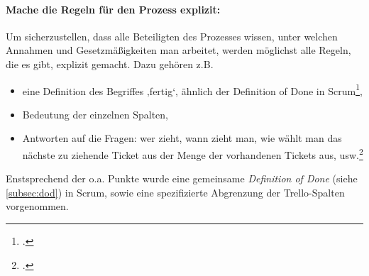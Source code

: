 \paragraph{Mache die Regeln für den Prozess explizit:}Um sicherzustellen, dass alle Beteiligten des Prozesses wissen, unter welchen Annahmen und Gesetzmäßigkeiten man arbeitet, werden möglichst alle Regeln, die es gibt, explizit gemacht. Dazu gehören z.B.
\begin{itemize}
\item eine Definition des Begriffes ‚fertig‘, ähnlich der Definition of Done in Scrum\footcite{wikiScrum},
\item Bedeutung der einzelnen Spalten,
\item Antworten auf die Fragen: wer zieht, wann zieht man, wie wählt man das nächste zu ziehende Ticket aus der Menge der vorhandenen Tickets aus, usw.\footcite{wikiKanban}
\end{itemize}

Enstsprechend der o.a. Punkte wurde eine gemeinsame \emph{Definition of Done} (siehe \ref{subsec:dod}) in Scrum, sowie eine spezifizierte Abgrenzung der Trello-Spalten vorgenommen.

